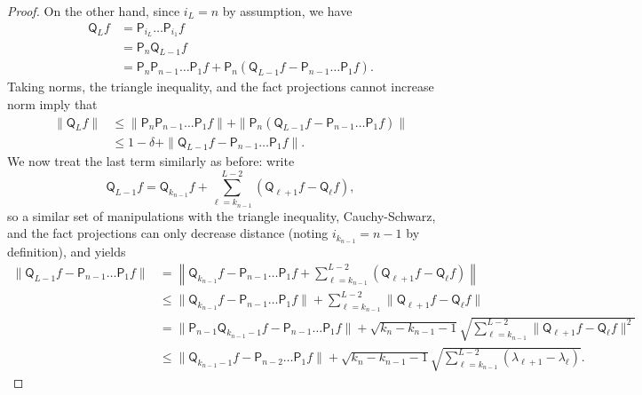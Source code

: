 \documentclass[11pt]{article}
\begin{document}
\begin{proof}
On the other hand, since $i_L=n$ by assumption, we have
\begin{align*}
    \mathsf{Q}_L f &=\mathsf{P}_{i_{L}}\ldots \mathsf{P}_{i_1}f\\
    &= \mathsf{P}_n \mathsf{Q}_{{L-1}}f\\
    &=\mathsf{P}_n\mathsf{P}_{n-1}\ldots \mathsf{P}_1f + \mathsf{P}_n(\mathsf{Q}_{{L-1}}f-\mathsf{P}_{n-1}\ldots \mathsf{P}_1f).
\end{align*}
Taking norms, the triangle inequality, and the fact projections cannot increase norm imply that
\begin{align}
    \|\mathsf{Q}_{{L}}f\|&\leq \|\mathsf{P}_n\mathsf{P}_{n-1}\ldots \mathsf{P}_1f\| + \|\mathsf{P}_n(\mathsf{Q}_{{L-1}}f-\mathsf{P}_{n-1}\ldots \mathsf{P}_1f)\| \nonumber\\
    &\leq 1-\delta + \|\mathsf{Q}_{{L-1}}f-\mathsf{P}_{n-1}\ldots \mathsf{P}_1f\| \label{eq:initial}.
\end{align}
We now treat the last term similarly as before: write
\begin{equation*}
    \mathsf{Q}_{{L-1}}f = \mathsf{Q}_{{k_{n-1}}}f+\sum_{\ell=k_{n-1}}^{L-2} (\mathsf{Q}_{{\ell+1}}f-\mathsf{Q}_{{\ell}}f) ,
\end{equation*}
so a similar set of manipulations with the triangle inequality, Cauchy-Schwarz, and the fact projections can only decrease distance (noting $i_{k_{n-1}}=n-1$ by definition), and  yields
\begin{align*}
    \|\mathsf{Q}_{{L-1}}f-\mathsf{P}_{n-1}\ldots \mathsf{P}_1f\|&=\left\| \mathsf{Q}_{{k_{n-1}}}f-\mathsf{P}_{n-1}\ldots \mathsf{P}_1f+\sum_{\ell=k_{n-1}}^{L-2} (\mathsf{Q}_{{\ell+1}}f-\mathsf{Q}_{{\ell}}f)\right\|\\
    &\leq \| \mathsf{Q}_{{k_{n-1}}}f-\mathsf{P}_{n-1}\ldots \mathsf{P}_1f\|+\sum_{\ell=k_{n-1}}^{L-2} \|\mathsf{Q}_{{\ell+1}}f-\mathsf{Q}_{{\ell}}f\|\\
    &=\| \mathsf{P}_{n-1}\mathsf{Q}_{{k_{n-1}-1}}f-\mathsf{P}_{n-1}\ldots \mathsf{P}_1f\|+\sqrt{k_{n}-k_{n-1}-1} \sqrt{\sum_{\ell=k_{n-1}}^{L-2} \|\mathsf{Q}_{{\ell+1}}f-\mathsf{Q}_{{\ell}}f\|^2}\\
    &\leq \|\mathsf{Q}_{{k_{n-1}-1}}f-\mathsf{P}_{n-2}\ldots \mathsf{P}_1f\|+\sqrt{k_n-k_{n-1}-1}\sqrt{\sum_{\ell=k_{n-1}}^{L-2} (\lambda_{\ell+1}-\lambda_{\ell})}.
\end{align*}


\end{proof}
\end{document}

